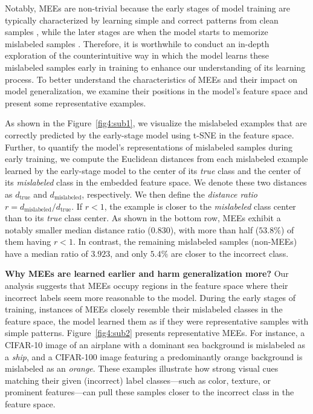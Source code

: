 Notably, MEEs are non-trivial because the early stages of model training are typically characterized by learning simple and correct patterns from clean samples \cite{arpit2017closer, toneva2018empirical}, while the later stages are when the model starts to memorize mislabeled samples \cite{zhang2021understanding, yuan2024early}. Therefore, it is worthwhile to conduct an in-depth exploration of the counterintuitive way in which the model learns these mislabeled samples early in training to enhance our understanding of its learning process.
To better understand the characteristics of MEEs and their impact on model generalization, we examine their positions in the model's feature space and present some representative examples.

As shown in the Figure~\ref{fig4:sub1}, we visualize the mislabeled examples that are correctly predicted by the early-stage model using t-SNE \citep{van2008visualizing} in the feature space. 
Further, to quantify the model's representations of mislabeled samples during early training, we compute the Euclidean distances from each mislabeled example learned by the early-stage model to the center of its \emph{true} class and the center of its \emph{mislabeled} class in the embedded feature space. We denote these two distances as $d_{\text{true}}$ and $d_{\text{mislabeled}}$, respectively. We then define the \emph{distance ratio} $r = d_{\text{mislabeled}} / d_{\text{true}}$. If $r < 1$, the example is closer to the \emph{mislabeled} class center than to its \emph{true} class center.
As shown in the bottom row, MEEs exhibit a notably smaller median distance ratio ($0.830$), with more than half ($53.8\%$) of them having $r < 1$. In contrast, the remaining mislabeled samples (non-MEEs) have a median ratio of $3.923$, and only $5.4\%$ are closer to the incorrect class. 

\textbf{Why MEEs are learned earlier and harm generalization more?}
Our analysis suggests that MEEs occupy regions in the feature space where their incorrect labels seem more reasonable to the model. During the early stages of training, instances of MEEs closely resemble their mislabeled classes in the feature space, the model learned them as if they were representative samples with simple patterns.  Figure~\ref{fig4:sub2} presents representative MEEs. For instance, a CIFAR-10 image of an airplane with a dominant sea background is mislabeled as a \emph{ship}, and a CIFAR-100 image featuring a predominantly orange background is mislabeled as an \emph{orange}. These examples illustrate how strong visual cues matching their given (incorrect) label classes—such as color, texture, or prominent features—can pull these samples closer to the incorrect class in the feature space.

